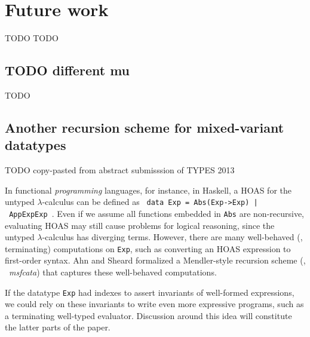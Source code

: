 \chapter{Future work}\label{ch:futwork} TODO
TODO


\section{TODO different mu}\label{sec:futwork:mu}
TODO

\section{Another recursion scheme for mixed-variant datatypes}
\label{sec:futwork:mprsi}
TODO copy-pasted from abstract submisssion of TYPES 2013

In functional \emph{programming} languages, for instance, in Haskell,
a HOAS for the untyped $\lambda$-calculus can be defined as
{\small\texttt{\,data Exp~=~Abs\;(Exp\;->\;Exp)~|~App\;Exp\;Exp\,}}.
Even if we assume all functions embedded in \texttt{Abs} are non-recursive,
evaluating HOAS may still cause problems for logical reasoning,
since the untyped $\lambda$-calculus has diverging terms. However, there are
many well-behaved (\ie, terminating) computations on \texttt{Exp}, such as
converting an HOAS expression to first-order syntax.
Ahn and Sheard \cite{AhnShe11} formalized a Mendler-style recursion scheme
(\MsfIt, \aka\ \textit{msfcata}) that captures these well-behaved computations.

If the datatype \texttt{Exp} had indexes to assert invariants of
well-formed expressions, we could rely on these invariants to write
even more expressive programs, such as a terminating well-typed evaluator.
Discussion around this idea will constitute the latter parts of the paper.
\vspace*{-2ex}
